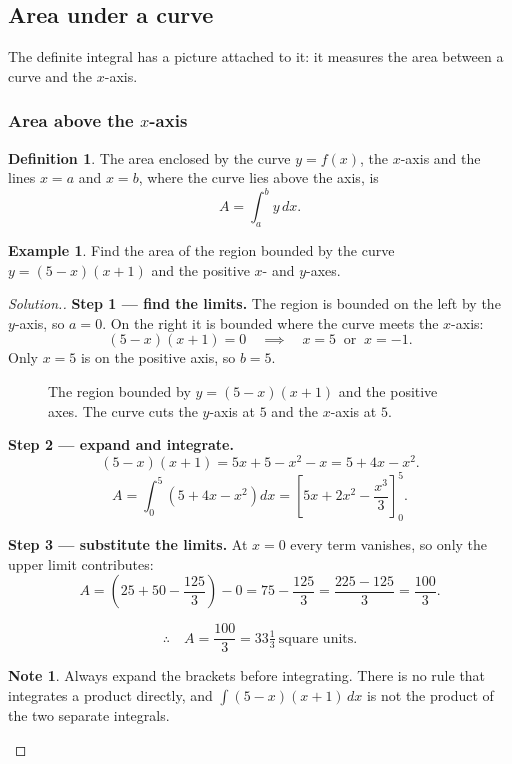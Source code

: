 \documentclass[11pt,a4paper]{article}
\theoremstyle{definition}
\newtheorem{definition}[thm]{Definition}
\newtheorem{example}[thm]{Example}
\newtheorem{note}[thm]{Note}
\newenvironment{solution}
  {\renewcommand{\qedsymbol}{}\begin{proof}[\textit{Solution}.]}
  {\end{proof}}
\begin{document}
\subsection{Area under a curve}

The definite integral has a picture attached to it: it measures the area between a curve
and the $x$-axis.

\subsubsection{Area above the $x$-axis}

\begin{definition}
The area enclosed by the curve $y=f(x)$, the $x$-axis and the lines $x=a$ and $x=b$,
where the curve lies above the axis, is
$$A=\int_a^b y\,dx.$$
\end{definition}

\begin{example}
Find the area of the region bounded by the curve $y=(5-x)(x+1)$ and the positive $x$-
and $y$-axes.
\end{example}

\begin{solution}
\textbf{Step 1 --- find the limits.} The region is bounded on the left by the $y$-axis,
so $a=0$. On the right it is bounded where the curve meets the $x$-axis:
$$(5-x)(x+1)=0\quad\implies\quad x=5\ \text{ or }\ x=-1.$$
Only $x=5$ is on the positive axis, so $b=5$.

\begin{figure}[H]
\centering
{}
\caption{The region bounded by $y=(5-x)(x+1)$ and the positive axes. The curve cuts the $y$-axis at $5$ and the $x$-axis at $5$.}
\end{figure}

\textbf{Step 2 --- expand and integrate.}
$$(5-x)(x+1)=5x+5-x^2-x=5+4x-x^2.$$
$$A=\int_0^5\left(5+4x-x^2\right)dx=\left[5x+2x^2-\frac{x^3}{3}\right]_0^5.$$

\textbf{Step 3 --- substitute the limits.} At $x=0$ every term vanishes, so only the
upper limit contributes:
$$A=\left(25+50-\frac{125}{3}\right)-0=75-\frac{125}{3}=\frac{225-125}{3}=\frac{100}{3}.$$

$$\therefore\quad A=\frac{100}{3}=33\tfrac{1}{3}\ \text{square units}.$$

\begin{note}
Always expand the brackets before integrating. There is no rule that integrates a
product directly, and $\int(5-x)(x+1)\,dx$ is not the product of the two separate
integrals.
\end{note}
\end{solution}
\end{document}
